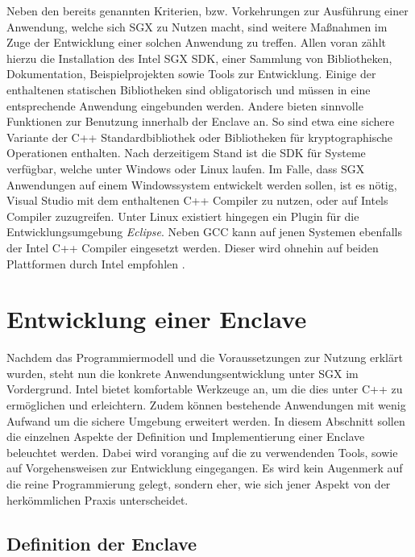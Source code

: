 Neben den bereits genannten Kriterien, bzw. Vorkehrungen zur Ausführung einer Anwendung, welche sich \ac{SGX} zu Nutzen macht, sind weitere Maßnahmen im Zuge der Entwicklung einer solchen Anwendung zu treffen. Allen voran zählt hierzu die Installation des Intel \ac{SGX} \ac{SDK}, einer Sammlung von Bibliotheken, Dokumentation, Beispielprojekten sowie Tools zur Entwicklung. Einige der enthaltenen statischen Bibliotheken sind obligatorisch und müssen in eine entsprechende Anwendung eingebunden werden. Andere bieten sinnvolle Funktionen zur Benutzung innerhalb der Enclave an. So sind etwa eine sichere Variante der C++ Standardbibliothek oder Bibliotheken für kryptographische Operationen enthalten. Nach derzeitigem Stand ist die \ac{SDK} für Systeme verfügbar, welche unter Windows oder Linux laufen. Im Falle, dass \ac{SGX} Anwendungen auf einem Windowssystem entwickelt werden sollen, ist es nötig, Visual Studio mit dem enthaltenen C++ Compiler zu nutzen, oder auf Intels Compiler zuzugreifen. Unter Linux existiert hingegen ein Plugin für die Entwicklungsumgebung \textit{Eclipse}. Neben GCC kann auf jenen Systemen ebenfalls der Intel C++ Compiler eingesetzt werden. Dieser wird ohnehin auf beiden Plattformen durch Intel empfohlen \cite{WinDev}.

\section{Entwicklung einer Enclave}

Nachdem das Programmiermodell und die Voraussetzungen zur Nutzung erklärt wurden, steht nun die konkrete Anwendungsentwicklung unter \ac{SGX} im Vordergrund. Intel bietet komfortable Werkzeuge an, um die dies unter C++ zu ermöglichen und erleichtern. Zudem können bestehende Anwendungen mit wenig Aufwand um die sichere Umgebung erweitert werden. In diesem Abschnitt sollen die einzelnen Aspekte der Definition und Implementierung einer Enclave beleuchtet werden. Dabei wird voranging auf die zu verwendenden Tools, sowie auf Vorgehensweisen zur Entwicklung eingegangen. Es wird kein Augenmerk auf die reine Programmierung gelegt, sondern eher, wie sich jener Aspekt von der herkömmlichen Praxis unterscheidet.

\subsection{Definition der Enclave}


